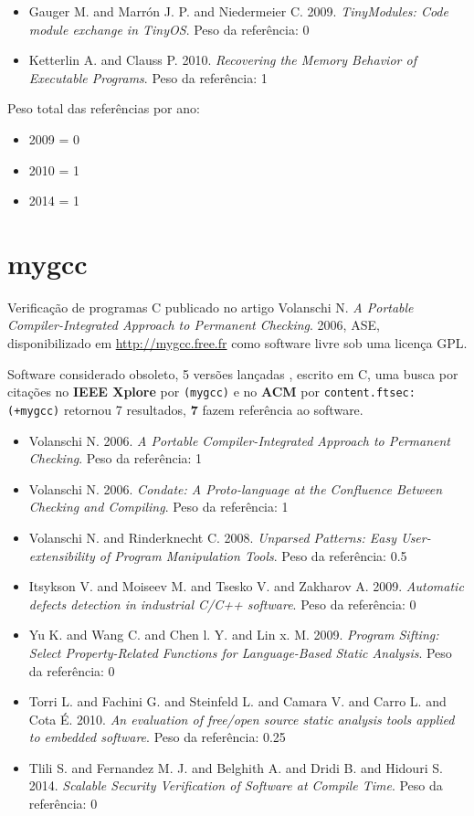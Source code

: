 \begin{itemize}
\item Gauger M. and Marrón J. P. and Niedermeier C.
      2009.
      {\it TinyModules: Code module exchange in TinyOS}.
      Peso da referência: 0
\item Ketterlin A. and Clauss P.
      2010.
      {\it Recovering the Memory Behavior of Executable Programs}.
      Peso da referência: 1
\end{itemize}

Peso total das referências por ano:

\begin{itemize}
\item 2009 = 0
\item 2010 = 1
\item 2014 = 1
\end{itemize}


\section{mygcc}

Verificação de programas C
publicado no artigo
Volanschi N.
{\it A Portable Compiler-Integrated Approach to Permanent Checking}.
2006,
ASE,
disponibilizado em \url{http://mygcc.free.fr}
como software livre
sob uma licença GPL.

Software considerado obsoleto,
5 versões lançadas
,
escrito em C,
uma busca por citações no {\bf IEEE Xplore} por
\texttt{(mygcc)}
e no {\bf ACM} por
\texttt{content.ftsec:(+mygcc)}
retornou
7 resultados,
{\bf 7} fazem referência ao software.

\begin{itemize}
\item Volanschi N.
      2006.
      {\it A Portable Compiler-Integrated Approach to Permanent Checking}.
      Peso da referência: 1
\item Volanschi N.
      2006.
      {\it Condate: A Proto-language at the Confluence Between Checking and Compiling}.
      Peso da referência: 1
\item Volanschi N. and Rinderknecht C.
      2008.
      {\it Unparsed Patterns: Easy User-extensibility of Program Manipulation Tools}.
      Peso da referência: 0.5
\item Itsykson V. and Moiseev M. and Tsesko V. and Zakharov A.
      2009.
      {\it Automatic defects detection in industrial C/C++ software}.
      Peso da referência: 0
\item Yu K. and Wang C. and Chen l. Y. and Lin x. M.
      2009.
      {\it Program Sifting: Select Property-Related Functions for Language-Based Static Analysis}.
      Peso da referência: 0
\item Torri L. and Fachini G. and Steinfeld L. and Camara V. and Carro L. and Cota É.
      2010.
      {\it An evaluation of free/open source static analysis tools applied to embedded software}.
      Peso da referência: 0.25
\item Tlili S. and Fernandez M. J. and Belghith A. and Dridi B. and Hidouri S.
      2014.
      {\it Scalable Security Verification of Software at Compile Time}.
      Peso da referência: 0
\end{itemize}


